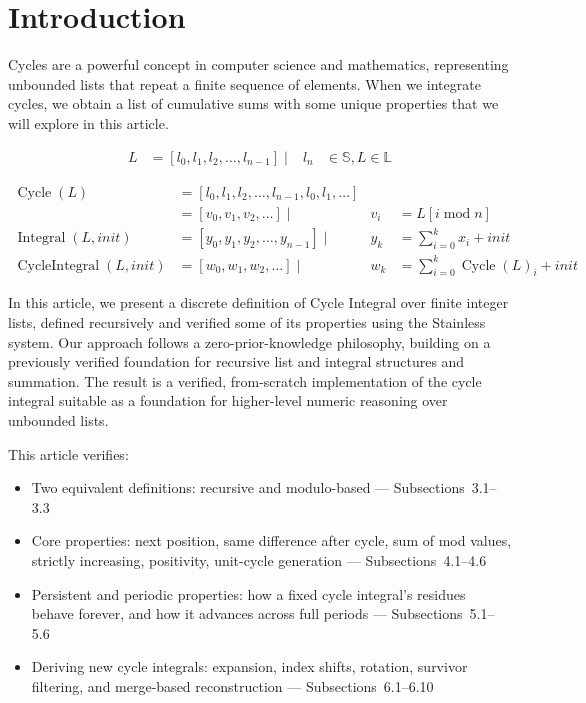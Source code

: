 \section{Introduction}

Cycles are a powerful concept in computer science and mathematics,
representing unbounded lists that repeat a finite sequence of elements. When
we integrate cycles, we obtain a list of cumulative sums with some unique
properties that we will explore in this article.

\begin{equation*}
\begin{aligned}
L &= [l_0, l_1, l_2, \ldots, l_{n-1}]  \mid &l_n &\in \mathbb{S}, L \in \mathbb{L}
\end{aligned}
\end{equation*}

\begin{equation*}
\begin{aligned}
\operatorname{Cycle}(L)               &= [l_0, l_1, l_2, \ldots, l_{n-1}, l_0, l_1, \ldots] \\
                              &= [v_0, v_1, v_2, \dots] \mid &v_i &= L[i \operatorname{mod} n] \\
\operatorname{Integral}(L, init)      &= [y_0, y_1, y_2, \ldots, y_{n-1}] \mid &y_k &= \sum_{i=0}^{k} x_i + init \\
\operatorname{CycleIntegral}(L, init) &= [w_0, w_1, w_2, \ldots] \mid          &w_k &= \sum_{i=0}^{k} \operatorname{Cycle}(L)_i + init
\end{aligned}
\end{equation*}

In this article, we present a discrete definition of Cycle Integral over
finite integer lists, defined recursively and verified some of its properties
using the Stainless system. Our approach follows a zero-prior-knowledge
philosophy, building on a previously verified foundation for recursive list
and integral structures and summation. The result is a verified, from-scratch
implementation of the cycle integral suitable as a foundation for
higher-level numeric reasoning over unbounded lists.

This article verifies:

\begin{itemize}
  \item Two equivalent definitions: recursive and modulo-based ---
    Subsections~3.1--3.3
  \item Core properties: next position, same difference after cycle, sum of
    mod values, strictly increasing, positivity, unit-cycle generation ---
    Subsections~4.1--4.6
  \item Persistent and periodic properties: how a fixed cycle integral's
    residues behave forever, and how it advances across full periods ---
    Subsections~5.1--5.6
  \item Deriving new cycle integrals: expansion, index shifts, rotation,
    survivor filtering, and merge-based reconstruction ---
    Subsections~6.1--6.10
\end{itemize}

